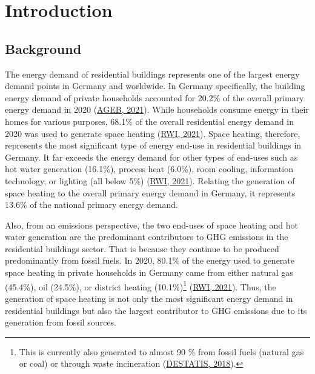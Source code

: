 \documentclass[12pt,twoside]{reedthesis}
\begin{document}
\mainmatter %
\pagestyle{fancyplain} %

\setlength{\parskip}{6pt} %

\hypertarget{introduction}{%
\chapter{Introduction}\label{introduction}}

\hypertarget{background}{%
\section{Background}\label{background}}

The energy demand of residential buildings represents one of the largest energy demand points in Germany and worldwide. In Germany specifically, the building energy demand of private households accounted for 20.2\% of the overall primary energy demand in 2020 (\protect\hyperlink{ref-ageb21}{AGEB, 2021}). While households consume energy in their homes for various purposes, 68.1\% of the overall residential energy demand in 2020 was used to generate space heating (\protect\hyperlink{ref-rwi21}{RWI, 2021}). Space heating, therefore, represents the most significant type of energy end-use in residential buildings in Germany. It far exceeds the energy demand for other types of end-uses such as hot water generation (16.1\%), process heat (6.0\%), room cooling, information technology, or lighting (all below 5\%) (\protect\hyperlink{ref-rwi21}{RWI, 2021}). Relating the generation of space heating to the overall primary energy demand in Germany, it represents 13.6\% of the national primary energy demand.

Also, from an emissions perspective, the two end-uses of space heating and hot water generation are the predominant contributors to GHG emissions in the residential buildings sector. That is because they continue to be produced predominantly from fossil fuels. In 2020, 80.1\% of the energy used to generate space heating in private households in Germany came from either natural gas (45.4\%), oil (24.5\%), or district heating (10.1\%)\footnote{This is currently also generated to almost 90 \% from fossil fuels (natural gas or coal) or through waste incineration (\protect\hyperlink{ref-destatis18}{DESTATIS, 2018}).} (\protect\hyperlink{ref-rwi21}{RWI, 2021}). Thus, the generation of space heating is not only the most significant energy demand in residential buildings but also the largest contributor to GHG emissions due to its generation from fossil sources.
\end{document}
